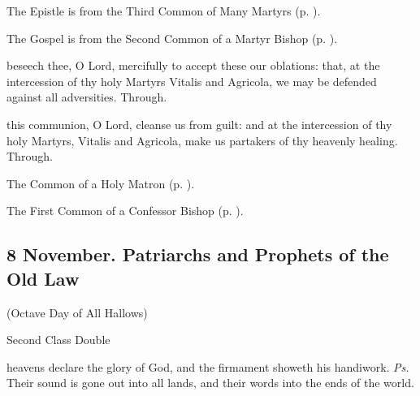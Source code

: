 \begin{rubric}
	The Epistle is from the Third Common of Many Martyrs (p. \pageref{CommonMartyrsIIIEpistle}).
\end{rubric}

\begin{rubric}
	The Gospel is from the Second Common of a Martyr Bishop (p. \pageref{CommonMartyrBishopIIGospel}).
\end{rubric}

\secret
{} beseech thee, O Lord, mercifully to accept these our oblations: that, at the intercession of thy holy Martyrs Vitalis and Agricola, we may be defended against all adversities. Through.

\postcommunion
{} this communion, O Lord, cleanse us from guilt: and at the intercession of thy holy Martyrs, Vitalis and Agricola, make us partakers of thy heavenly healing. Through.



\begin{rubric}
	The Common of a Holy Matron (p. \pageref{CommonNeitherVirginMartyr}).
\end{rubric}



\begin{rubric}
	The First Common of a Confessor Bishop (p. \pageref{CommonConfessorBishopI}).
\end{rubric}


\clearpage
\subsection{8 November. Patriarchs and Prophets of the Old Law}

\centerline{\small{(Octave Day of All Hallows)}}

\begin{inhead}
	Second Class Double
\end{inhead}


\introit
{} heavens declare the glory of God, and the firmament showeth his handiwork. \textit{Ps.} Their sound is gone out into all lands, and their words into the ends of the world.

